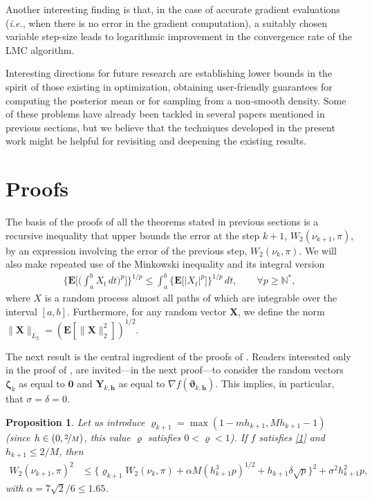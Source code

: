 \documentclass[aoap,preprint,reqno,a4paper]{imsart} %
\newcommand{\NN}{\mathbb{N}}
\newcommand{\bzeta}{\boldsymbol{\zeta}}
\newcommand{\bvartheta}{\boldsymbol{\vartheta}}
\newcommand{\bfE}{\mathbf E}
\newcommand{\bh}{\boldsymbol h}
\newcommand{\bX}{\boldsymbol X}
\newcommand{\bY}{\boldsymbol Y}
\newtheorem{proposition}{Proposition}
\begin{document}
Another interesting finding is that, in the case of accurate gradient evaluations (\textit{i.e.}, when
there is no error in the gradient computation), a suitably chosen variable step-size leads to logarithmic
improvement in the convergence rate of the LMC algorithm.

Interesting directions for future research are establishing lower bounds in the spirit of those existing
in optimization, obtaining user-friendly guarantees for computing the posterior mean or for sampling from
a non-smooth density. Some of these problems have already been tackled in several papers mentioned in
previous sections, but we believe that the techniques developed in the present work might be helpful for
revisiting and deepening the existing results.


\section{Proofs}
\label{secProof}

The basis of the proofs of all the theorems stated in previous sections
is a recursive inequality that upper bounds the error at the step $k+1$,
$W_2(\nu_{k+1},\pi)$, by an expression involving the error of the previous
step, $W_2(\nu_k,\pi)$.  We will also make repeated use of the Minkowski inequality
and its integral version
\begin{align}\label{eqA}
\bigg\{\bfE\bigg[\bigg(\int_a^b X_t\,dt\bigg)^p\bigg]\bigg\}^{1/p} \le
\int_a^b\big\{\bfE\big[|X_t|^p\big]\big\}^{1/p} \,dt, \qquad \forall p\ge \NN^*,
\end{align}
where $X$ is a random process almost all paths of which are integrable over
the interval $[a,b]$. Furthermore, for any random vector $\bX$, we define the norm
$\|\bX\|_{L_2} = (\bfE[\|\bX\|_2^2])^{1/2}$.


The next result is the central ingredient of the proofs of . Readers
interested only in the proof of , are invited---in the next proof---to consider
the random vectors $\bzeta_k$ as equal to $\mathbf 0$ and $\bY_{k,\bh}$ as equal to
$\nabla f(\bvartheta_{k,\bh})$. This implies, in particular, that $\sigma = \delta =0$.

\begin{proposition}\label{propA}
Let us introduce $\varrho_{k+1}= \max(1-mh_{k+1}, Mh_{k+1}-1)$ (since $h\in(0,\nicefrac2M)$,
this value $\varrho$ satisfies $0< \varrho <1$). If $f$ satisfies \eqref{1} and $h_{k+1}\le 2/M$, then
\begin{align}
W_2(\nu_{k+1},\pi)^2
		&\le \big\{\varrho_{k+1}W_2(\nu_{k},\pi) +\alpha M(h_{k+1}^3p)^{1/2} + h_{k+1}\delta\sqrt{p}\big\}^2
		+ \sigma^2 h_{k+1}^2 p,\label{DD}
\end{align}
with $\alpha = 7\sqrt{2}/6\le 1.65$.
\end{proposition}
\end{document}
